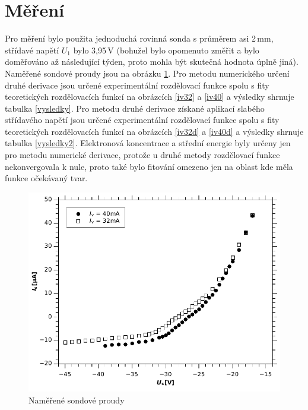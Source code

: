 \documentclass[12pt]{article}
\begin{document}
\section{Měření}
Pro měření bylo použita jednoduchá rovinná sonda s průměrem asi 2\,mm, střídavé napětí $U_1$ bylo 3,95\,V (bohužel bylo opomenuto změřit a bylo doměřováno až následující týden, proto mohla být skutečná hodnota úplně jiná). Naměřené sondové proudy jsou na obrázku \ref{proud}. Pro metodu numerického určení druhé derivace jsou určené experimentální rozdělovací funkce spolu s fity teoretických rozdělovacích funkcí  na obrázcích \ref{iv32} a \ref{iv40} a výsledky shrnuje tabulka \ref{vysledky}. Pro metodu druhé derivace získané aplikací slabého střídavého napětí jsou určené experimentální rozdělovací funkce spolu s fity teoretických rozdělovacích funkcí  na obrázcích \ref{iv32d} a \ref{iv40d} a výsledky shrnuje tabulka \ref{vysledky2}. Elektronová koncentrace a střední energie byly určeny jen pro metodu numerické derivace, protože u druhé metody rozdělovací funkce nekonvergovala k nule, proto také bylo fitování omezeno jen na oblast kde měla funkce očekávaný tvar.

\begin{figure}[htbp]
\begin{center}
\includegraphics[width=12cm]{Graph1.pdf}
\caption{Naměřené sondové proudy}
\label{proud}
\end{center}
\end{figure}
\end{document}
